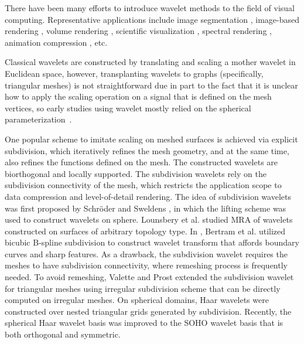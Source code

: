 There have been many efforts to introduce wavelet methods to the field of visual computing.
Representative applications include image segmentation \cite{Figueiredo:2005:CVPR},
image-based rendering \cite{Overbeck:2009:TOG}, volume rendering \cite{Lippert:1995},
scientific visualization \cite{Cracium:2005:TVCG}, spectral rendering \cite{Iehl:2000:CGF},
animation compression \cite{Payan:2007:CG}, etc.

Classical wavelets are constructed by translating and scaling a mother wavelet in Euclidean
space, however, transplanting wavelets to graphs (specifically, triangular meshes) is not
straightforward due in part to the fact that it is unclear how to apply the scaling operation
on a signal that is defined on the mesh vertices, so early studies using wavelet mostly
relied on the spherical parameterization~\cite{Werghi:2002,Liu:2007}.

One popular scheme to imitate scaling on meshed surfaces is achieved via explicit subdivision,
which iteratively refines the mesh geometry, and at the same time, also refines the functions
defined on the mesh. The constructed wavelets are biorthogonal and locally supported.
The subdivision wavelets rely on the subdivision connectivity of the mesh, which restricts the
application scope to data compression and level-of-detail rendering. The idea of subdivision
wavelets was first proposed by Schr\"{o}der and Sweldens \cite{Schroder:1995:SIGGRAPH}, in
which the lifting scheme was used to construct wavelets on sphere.
Lounsbery et al. \cite{Lounsbery:1997:TOG} studied MRA of wavelets constructed on surfaces
of arbitrary topology type. In \cite{Bertram:2000:vis}, Bertram et al. utilized bicubic
B-spline subdivision to construct wavelet transform that affords boundary curves and sharp
features. As a drawback, the subdivision wavelet
requires the meshes to have subdivision connectivity, where remeshing process is frequently
needed. To avoid remeshing, Valette and Prost \cite{Valette:2004:TVCG} extended the subdivision
wavelet for triangular meshes using irregular subdivision scheme that can be directly computed
on irregular meshes. On spherical domains, Haar wavelets \cite{Nielson:1997:vis,Bonneau:1999:vis}
were constructed over nested triangular grids generated by subdivision. Recently, the spherical
Haar wavelet basis was improved to the SOHO wavelet basis \cite{Lessig:2008:TOG} that is both
orthogonal and symmetric.

